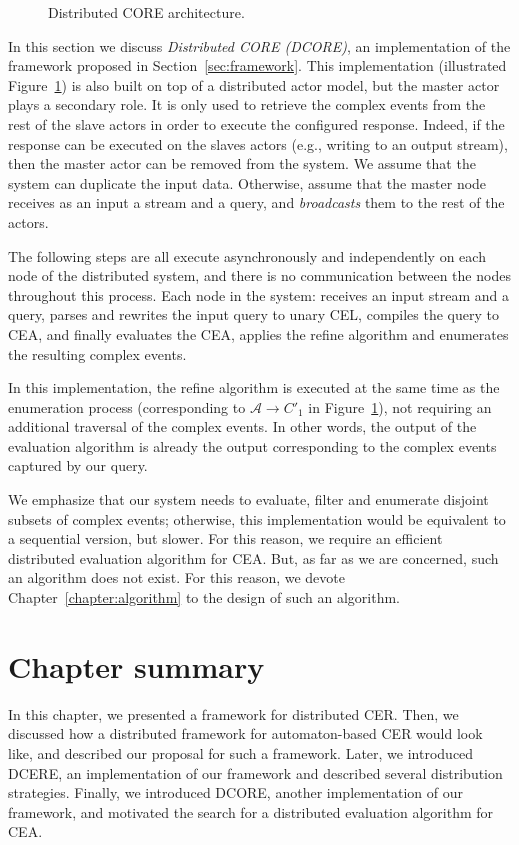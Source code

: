\begin{figure}[t]
  \centering
  \caption{Distributed CORE architecture.}
  \label{fig:dcore}
\end{figure}

In this section we discuss \emph{Distributed CORE (DCORE)}, an implementation of the framework proposed in Section~\ref{sec:framework}. This implementation (illustrated Figure~\ref{fig:dcore}) is also built on top of a distributed actor model, but the master actor plays a secondary role. It is only used to retrieve the complex events from the rest of the slave actors in order to execute the configured response. Indeed, if the response can be executed on the slaves actors (e.g., writing to an output stream), then the master actor can be removed from the system. We assume that the system can duplicate the input data. Otherwise, assume that the master node receives as an input a stream and a query, and \emph{broadcasts} them to the rest of the actors.

The following steps are all execute asynchronously and independently on each node of the distributed system, and there is no communication between the nodes throughout this process. Each node in the system: receives an input stream and a query, parses and rewrites the input query to unary CEL, compiles the query to CEA, and finally evaluates the CEA, applies the refine algorithm and enumerates the resulting complex events.

In this implementation, the refine algorithm is executed at the same time as the enumeration process (corresponding to $\mathcal{A} \to C'_{1}$ in Figure~\ref{fig:dcore}), not requiring an additional traversal of the complex events. In other words, the output of the evaluation algorithm is already the output corresponding to the complex events captured by our query.

We emphasize that our system needs to evaluate, filter and enumerate disjoint subsets of complex events; otherwise, this implementation would be equivalent to a sequential version, but slower. For this reason, we require an efficient distributed evaluation algorithm for CEA. But, as far as we are concerned, such an algorithm does not exist. For this reason, we devote Chapter~\ref{chapter:algorithm} to the design of such an algorithm.

\section{Chapter summary}

In this chapter, we presented a framework for distributed CER. Then, we discussed how a distributed framework for automaton-based CER would look like, and described our proposal for such a framework. Later, we introduced DCERE, an implementation of our framework and described several distribution strategies. Finally, we introduced DCORE, another implementation of our framework, and motivated the search for a distributed evaluation algorithm for CEA.

